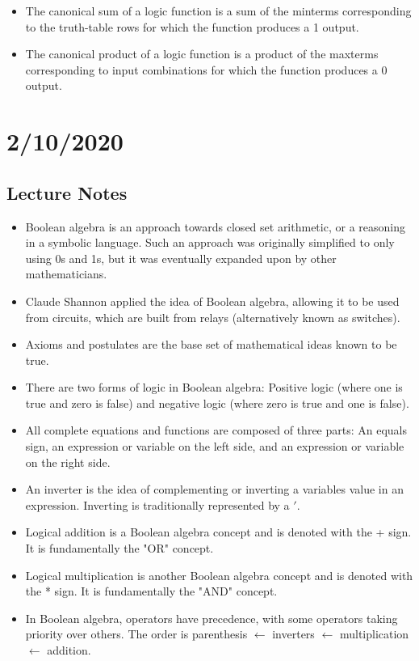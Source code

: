 \documentclass[10pt,a4paper]{article}
\begin{document}
\begin{itemize}
\item The canonical sum of a logic function is a sum of the minterms corresponding to the truth-table rows for which the function produces a 1 output. 
\item The canonical product of a logic function is a product of the maxterms corresponding to input combinations for which the function produces a 0 output. 
\end{itemize}\pagebreak
\section{2/10/2020}
\subsection{Lecture Notes}
\begin{itemize}
\item Boolean algebra is an approach towards closed set arithmetic, or a reasoning in a symbolic language. Such an approach was originally simplified to only using 0s and 1s, but it was eventually expanded upon by other mathematicians. 
\item Claude Shannon applied the idea of Boolean algebra, allowing it to be used from circuits, which are built from relays (alternatively known as switches). 
\item Axioms and postulates are the base set of mathematical ideas known to be true. 
\item There are two forms of logic in Boolean algebra: Positive logic (where one is true and zero is false) and negative logic (where zero is true and one is false). 
\item All complete equations and functions are composed of three parts: An equals sign, an expression or variable on the left side, and an expression or variable on the right side. 
\item An inverter is the idea of complementing or inverting a variables value in an expression. Inverting is traditionally represented by a $'$. 
\item Logical addition is a Boolean algebra concept and is denoted with the + sign. It is fundamentally the "OR" concept. 
\item Logical multiplication is another Boolean algebra concept and is denoted with the * sign. It is fundamentally the "AND" concept.
\item In Boolean algebra, operators have precedence, with some operators taking priority over others. The order is parenthesis $\gets$ inverters $\gets$ multiplication $\gets$ addition. 

\end{itemize}
\end{document}
